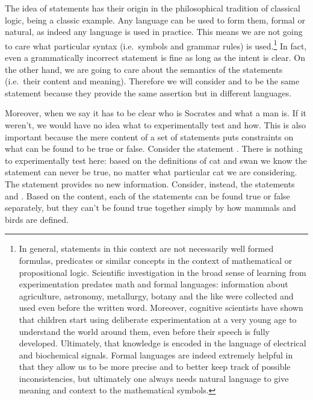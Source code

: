\documentclass[11pt,letterpaper,fleqn]{memoir} %
\begin{document}
The idea of statements has their origin in the philosophical tradition of classical logic,  being a classic example. Any language can be used to form them, formal or natural, as indeed any language is used in practice. This means we are not going to care what particular syntax (i.e.~symbols and grammar rules) is used.\footnote{In general, statements in this context are not necessarily well formed formulas, predicates or similar concepts in the context of mathematical or propositional logic. Scientific investigation in the broad sense of learning from experimentation predates math and formal languages: information about agriculture, astronomy, metallurgy, botany and the like were collected and used even before the written word. Moreover, cognitive scientists have shown that children start using deliberate experimentation at a very young age to understand the world around them, even before their speech is fully developed. Ultimately, that knowledge is encoded in the language of electrical and biochemical signals. Formal languages are indeed extremely helpful in that they allow us to be more precise and to better keep track of possible inconsistencies, but ultimately one always needs natural language to give meaning and context to the mathematical symbols.} In fact, even a grammatically incorrect statement is fine as long as the intent is clear. On the other hand, we are going to care about the semantics of the statements (i.e.~their content and meaning). Therefore we will consider  and  to be the same statement because they provide the same assertion but in different languages.

Moreover, when we say  it has to be clear who is Socrates and what a man is. If it weren't, we would have no idea what to experimentally test and how. This is also important because the mere content of a set of statements puts constraints on what can be found to be true or false. Consider the statement . There is nothing to experimentally test here: based on the definitions of cat and swan we know the statement can never be true, no matter what particular cat we are considering. The statement provides no new information. Consider, instead, the statements  and . Based on the content, each of the statements can be found true or false separately, but they can't be found true together simply by how mammals and birds are defined.
\end{document}
